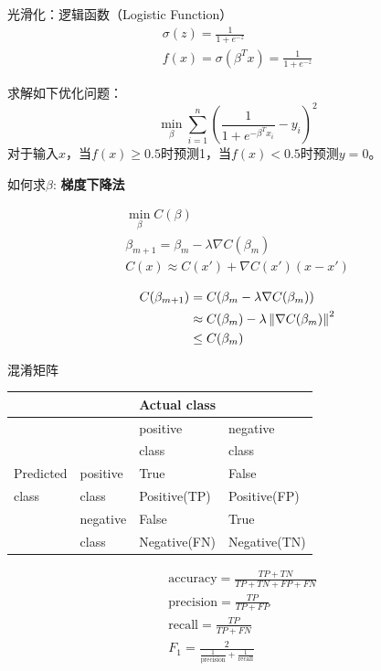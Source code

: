 \documentclass[11pt]{article}
\begin{document}
光滑化：逻辑函数（Logistic Function）
\begin{gather*}
\sigma(z)=\frac{1}{1+e^{-z}}\\
f(x)=\sigma(\beta^Tx)=\frac{1}{1+e^{-z}}
\end{gather*}

求解如下优化问题：
\begin{equation*}
\min_\beta\sum_{i=1}^n\left( \frac{1}{1+e^{-\beta^Tx_i}}-y_i \right)^2
\end{equation*}
对于输入\(x\)，当\(f(x)\ge 0.5\)时预测1，当\(f(x)<0.5\)时预测\(y=0\)。

如何求\(\beta\): \textbf{梯度下降法}

\begin{gather*}
\min_\beta C(\beta)\\
\beta_{m+1}=\beta_m-\lambda\nabla C(\beta_m)\\
C(x)\approx C(x')+\nabla C(x')(x-x')\\
\end{gather*}
\begin{align*}
C(\beta_{m+1})&=C(\beta_m-\lambda\nabla C(\beta_m))\\
&\approx C(\beta_m)-\lambda\left\lVert\nabla C(\beta_m)\right\rVert^2\\
&\le C(\beta_m)
\end{align*}

混淆矩阵
\begin{center}
\begin{tabular}{|l|l|l|l|}
\hline
 & & \multicolumn{2}{l|}{Actual class} \\
\hline
 & & positive & negative \\
 & & class & class \\
\hline
Predicted & positive & True & False \\
class & class & Positive(TP) & Positive(FP) \\
\cline{2-4}
 & negative & False & True \\
 & class & Negative(FN) & Negative(TN) \\
\hline
\end{tabular}
\end{center}

\begin{align*}
&\text{accuracy}=\frac{TP+TN}{TP+TN+FP+FN}\\
&\text{precision}=\frac{TP}{TP+FP}\\
&\text{recall}=\frac{TP}{TP+FN}\\
&F_1=\frac{2}{\frac{1}{\text{precision}}+\frac{1}{\text{recall}}}
\end{align*}
\end{document}
